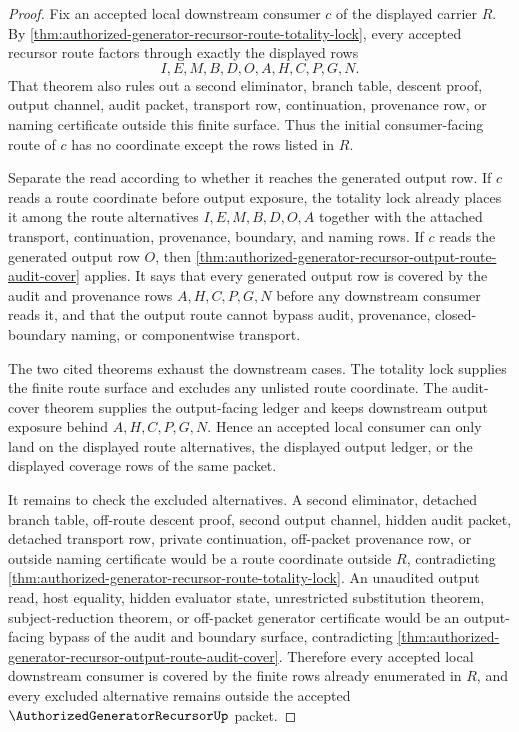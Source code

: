 \begin{proof}
Fix an accepted local downstream consumer $c$ of the displayed carrier $R$. By \autoref{thm:authorized-generator-recursor-route-totality-lock}, every accepted recursor route factors through exactly the displayed rows
$$
I,E,M,B,D,O,A,H,C,P,G,N.
$$
That theorem also rules out a second eliminator, branch table, descent proof, output channel, audit packet, transport row, continuation, provenance row, or naming certificate outside this finite surface. Thus the initial consumer-facing route of $c$ has no coordinate except the rows listed in $R$.

Separate the read according to whether it reaches the generated output row. If $c$ reads a route coordinate before output exposure, the totality lock already places it among the route alternatives $I,E,M,B,D,O,A$ together with the attached transport, continuation, provenance, boundary, and naming rows. If $c$ reads the generated output row $O$, then \autoref{thm:authorized-generator-recursor-output-route-audit-cover} applies. It says that every generated output row is covered by the audit and provenance rows $A,H,C,P,G,N$ before any downstream consumer reads it, and that the output route cannot bypass audit, provenance, closed-boundary naming, or componentwise transport.

The two cited theorems exhaust the downstream cases. The totality lock supplies the finite route surface and excludes any unlisted route coordinate. The audit-cover theorem supplies the output-facing ledger and keeps downstream output exposure behind $A,H,C,P,G,N$. Hence an accepted local consumer can only land on the displayed route alternatives, the displayed output ledger, or the displayed coverage rows of the same packet.

It remains to check the excluded alternatives. A second eliminator, detached branch table, off-route descent proof, second output channel, hidden audit packet, detached transport row, private continuation, off-packet provenance row, or outside naming certificate would be a route coordinate outside $R$, contradicting \autoref{thm:authorized-generator-recursor-route-totality-lock}. An unaudited output read, host equality, hidden evaluator state, unrestricted substitution theorem, subject-reduction theorem, or off-packet generator certificate would be an output-facing bypass of the audit and boundary surface, contradicting \autoref{thm:authorized-generator-recursor-output-route-audit-cover}. Therefore every accepted local downstream consumer is covered by the finite rows already enumerated in $R$, and every excluded alternative remains outside the accepted $\AuthorizedGeneratorRecursorUp$ packet.
\end{proof}
